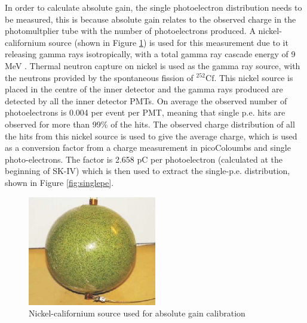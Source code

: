 In order to calculate absolute gain, the single photoelectron distribution needs to be measured, this is because absolute gain relates to the observed charge in the photomultplier tube with the number of photoelectrons produced. A nickel-californium source (shown in Figure \ref{fig:nickel_source}) is used for this measurement due to it releasing gamma rays isotropically, with a total gamma ray cascade energy of 9 MeV \cite{koshio1998study}. Thermal neutron capture on nickel is used as the gamma ray source, with the neutrons provided by the spontaneous fission of ${ }^{252} \mathrm{Cf}$. This nickel source is placed in the centre of the inner detector and the gamma rays produced are detected by all the inner detector PMTs. On average the observed number of photoelectrons is 0.004 per event per PMT, meaning that single p.e. hits are observed for more than 99\% of the hits. The observed charge distribution of all the hits from this nickel source is used to give the average charge, which is used as a conversion factor from a charge measurement in picoColoumbs and single photo-electrons. The factor is 2.658 pC per photoelectron (calculated at the beginning of SK-IV) which is then used to extract the single-p.e. distribution, shown in Figure \ref{fig:singlepe}.

\begin{figure}
    \centering
        \includegraphics[width=0.5\textwidth]{Figures/nickel_source.png}
    \caption{Nickel-californium source used for absolute gain calibration \cite{abe_calibration_2014}}
        \label{fig:nickel_source}
\end{figure}


